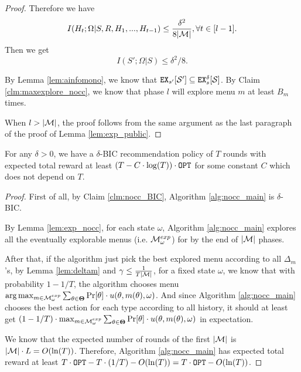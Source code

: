 \begin{proof}
Therefore we have
\[
I(H_t; \Omega|S,R,H_1,...,H_{t-1}) \leq \frac{\delta^2}{8|\mathcal{M}|}, \forall t \in [l-1].
\]
Then we get 
\[
I(S'; \Omega | S) \leq \delta^2/8.
\]

By Lemma \ref{lem:ainfomono}, we know that $\mathtt{EX}_{s'}[\mathcal{S}'] \subseteq \mathtt{EX}^{\delta}_s[\mathcal{S}]$. By Claim \ref{clm:maxexplore_nocc}, we know that phase $l$ will explore menu $m$ at least $B_m$ times.

When $l > |\mathcal{M}|$, the proof follows from the same argument as the last paragraph of the proof of Lemma \ref{lem:exp_public}.
\end{proof}

\begin{corollary}
\label{cor:private_nocc}
For any $\delta > 0$, we have a $\delta$-BIC recommendation policy of $T$ rounds with expected total reward at least $\left(T - C\cdot \log(T) \right) \cdot \mathtt{OPT}$ for some constant $C$ which does not depend on $T$. 
\end{corollary}

\begin{proof}

First of all, by Claim \ref{clm:nocc_BIC}, Algorithm \ref{alg:nocc_main} is $\delta$-BIC. 

By Lemma \ref{lem:exp_nocc}, for each state $\omega$, Algorithm \ref{alg:nocc_main} explores all the eventually explorable menus (i.e. $\mathcal{M}_{\omega}^{exp}$) for by the end of $|\mathcal{M}|$ phases. 

After that, if the algorithm just pick the best explored menu according to all $\Delta_m$'s, by Lemma \ref{lem:deltam} and $\gamma \leq \frac{1}{T|\mathcal{M}|}$, for a fixed state $\omega$, we know that with probability $1- 1/T$, the algorithm chooses menu $\arg\max_{m \in \mathcal{M}_{\omega}^{exp}} \sum_{\theta \in \bold{\Theta}} \Pr[\theta] \cdot u(\theta, m(\theta), \omega)$. And since Algorithm \ref{alg:nocc_main} chooses the best action for each type according to all history, it should at least get $(1-1/T) \cdot \max_{m \in \mathcal{M}_{\omega}^{exp}} \sum_{\theta \in \bold{\Theta}} \Pr[\theta] \cdot u(\theta, m(\theta), \omega)$ in expectation.

We know that the expected number of rounds of the first  $|\mathcal{M}|$ is $|\mathcal{M}| \cdot L = O(\ln(T))$. Therefore, Algorithm \ref{alg:nocc_main} has expected total reward at least $T \cdot \mathtt{OPT}- T \cdot (1/T) - O(\ln(T)) = T\cdot \mathtt{OPT} - O(\ln(T))$.

\end{proof}

